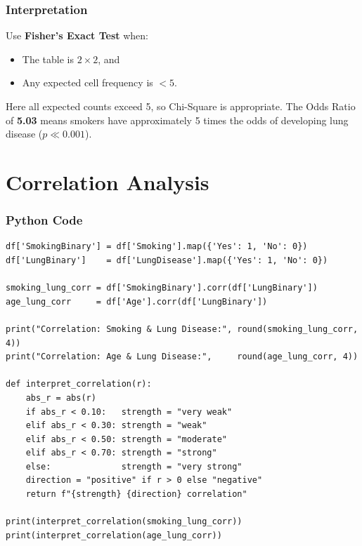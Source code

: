 \documentclass[12pt,a4paper]{article}
\begin{document}
\subsubsection{Interpretation}

Use \textbf{Fisher's Exact Test} when:
\begin{itemize}[leftmargin=*]
  \item The table is $2 \times 2$, and
  \item Any expected cell frequency is $< 5$.
\end{itemize}

Here all expected counts exceed 5, so Chi-Square is appropriate. The Odds Ratio of \textbf{5.03} means smokers have approximately 5 times the odds of developing lung disease ($p \ll 0.001$).

\section{Correlation Analysis}

\subsubsection{Python Code}

\begin{lstlisting}[style=pythonstyle]
df['SmokingBinary'] = df['Smoking'].map({'Yes': 1, 'No': 0})
df['LungBinary']    = df['LungDisease'].map({'Yes': 1, 'No': 0})

smoking_lung_corr = df['SmokingBinary'].corr(df['LungBinary'])
age_lung_corr     = df['Age'].corr(df['LungBinary'])

print("Correlation: Smoking & Lung Disease:", round(smoking_lung_corr, 4))
print("Correlation: Age & Lung Disease:",     round(age_lung_corr, 4))

def interpret_correlation(r):
    abs_r = abs(r)
    if abs_r < 0.10:   strength = "very weak"
    elif abs_r < 0.30: strength = "weak"
    elif abs_r < 0.50: strength = "moderate"
    elif abs_r < 0.70: strength = "strong"
    else:              strength = "very strong"
    direction = "positive" if r > 0 else "negative"
    return f"{strength} {direction} correlation"

print(interpret_correlation(smoking_lung_corr))
print(interpret_correlation(age_lung_corr))
\end{lstlisting}
\end{document}
